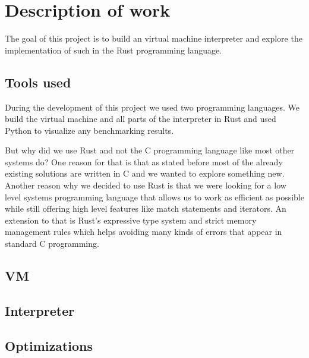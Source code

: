 \documentclass{article}
\begin{document}
\section{Description of work}
The goal of this project is to build an virtual machine interpreter and 
explore the implementation of such in the Rust programming language.

\subsection{Tools used}
During the development of this project we used two programming languages. We
build the virtual machine and all parts of the interpreter in Rust and used 
Python to visualize any benchmarking results.

But why did we use Rust and not the C programming language like most other
systems do?
One reason for that is that as stated before most of the already existing
solutions are written in C and we wanted to explore something new.
Another reason why we decided to use Rust is that we were looking for a low level
systems programming language that allows us to work as efficient as possible
while still offering high level features like match statements and iterators.
An extension to that is Rust's expressive type system and strict memory
management rules which helps avoiding many kinds of errors that appear in 
standard C programming.

\subsection{VM} %
\subsection{Interpreter} %
\subsection{Optimizations} %

\clearpage


\end{document}
